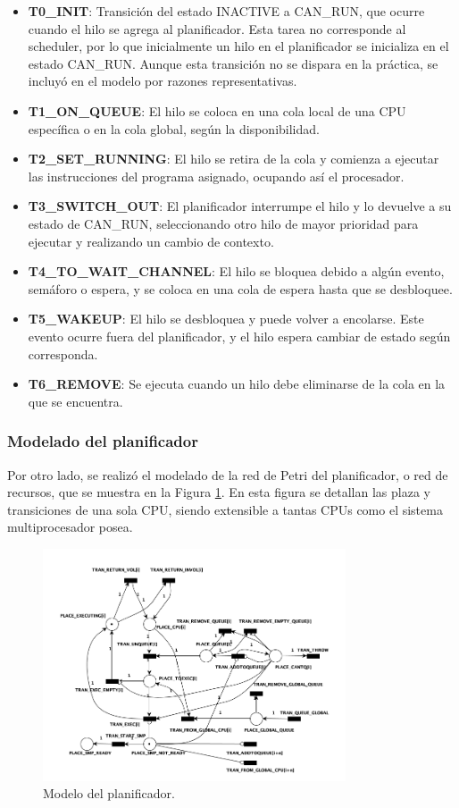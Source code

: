 \begin{itemize}
    \item \textbf{T0\_INIT}: Transición del estado INACTIVE a CAN\_RUN, que ocurre cuando el hilo se agrega al planificador. Esta tarea no corresponde al scheduler, por lo que inicialmente un hilo en el planificador se inicializa en el estado CAN\_RUN. Aunque esta transición no se dispara en la práctica, se incluyó en el modelo por razones representativas.
    \item \textbf{T1\_ON\_QUEUE}: El hilo se coloca en una cola local de una CPU específica o en la cola global, según la disponibilidad.
    \item \textbf{T2\_SET\_RUNNING}: El hilo se retira de la cola y comienza a ejecutar las instrucciones del programa asignado, ocupando así el procesador.
    \item \textbf{T3\_SWITCH\_OUT}: El planificador interrumpe el hilo y lo devuelve a su estado de CAN\_RUN, seleccionando otro hilo de mayor prioridad para ejecutar y realizando un cambio de contexto.
    \item \textbf{T4\_TO\_WAIT\_CHANNEL}: El hilo se bloquea debido a algún evento, semáforo o espera, y se coloca en una cola de espera hasta que se desbloquee.
    \item \textbf{T5\_WAKEUP}: El hilo se desbloquea y puede volver a encolarse. Este evento ocurre fuera del planificador, y el hilo espera cambiar de estado según corresponda.
    \item \textbf{T6\_REMOVE}: Se ejecuta cuando un hilo debe eliminarse de la cola en la que se encuentra.
\end{itemize}


\subsubsection{Modelado del planificador}

Por otro lado, se realizó el modelado de la red de Petri del planificador, o red de recursos, que se muestra en la Figura \ref{fig:schedulerModel}. En esta figura se detallan las plaza y transiciones de una sola CPU, siendo extensible a tantas CPUs como el sistema multiprocesador posea.

\begin{figure}[H]
    \centering
    \includegraphics[width=0.8\textwidth]{images/Resource_1CPU.png}
    \caption{Modelo del planificador.}
    \label{fig:schedulerModel}
\end{figure}

